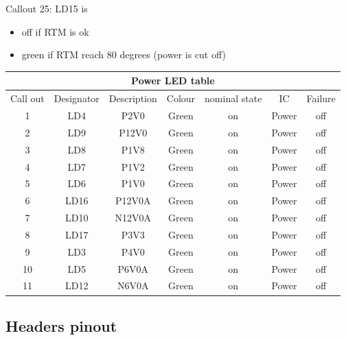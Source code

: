 Callout 25: LD15 is
\begin{itemize}
	\item off if RTM is ok
	\item green if RTM reach 80 degrees (power is cut off)
	\end{itemize}


\begin{longtable}{|c|c|c|c|c|c|c|} \hline
		\multicolumn{7}{|c|}{Power LED table }\\ \hline
	Call out & Designator & Description&  Colour &nominal state& IC &Failure\\ \hline
	1 & LD4 & P2V0 & Green & on & Power & off \\ \hline
	2 & LD9 & P12V0 & Green & on & Power & off \\ \hline 
	3 & LD8 & P1V8 & Green & on & Power & off \\ \hline 
	4 & LD7 & P1V2 & Green & on & Power & off \\ \hline 
	5 & LD6 & P1V0 & Green & on & Power & off \\ \hline 
	6 & LD16 & P12V0A & Green & on & Power & off \\ \hline 
	7 & LD10 & N12V0A & Green & on & Power & off \\ \hline 
	8 & LD17 & P3V3 & Green & on & Power & off \\ \hline 
	9 & LD3 & P4V0 & Green & on & Power & off \\ \hline 
	10 & LD5 & P6V0A & Green & on & Power & off \\ \hline  	
	11 & LD12 & N6V0A & Green & on & Power & off \\ \hline  		 
\end{longtable}

\subsection{Headers pinout}

